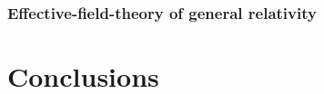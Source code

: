 \documentclass[twocolumn,
               prd,
               aps,
               superscriptaddress,
               tightenlines,
               nofootinbib,
               eqsecnum,
               amsfonts,
               amsmath,
               longbibliography]{revtex4-1}
\newcommand{\hs}[1]{{\textcolor{blue}{{[HS: #1]}} }}
\begin{document}
\subsubsection{Effective-field-theory of general relativity}
\label{sec:results_efts}

%

\section{Conclusions}
\label{sec:conclusions}

\end{document}
